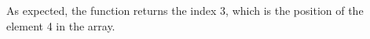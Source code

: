 \documentclass[preview]{standalone}
\begin{document}
As expected, the function returns the index 3, which is the position of the element 4 in the array.\\
\end{document}
